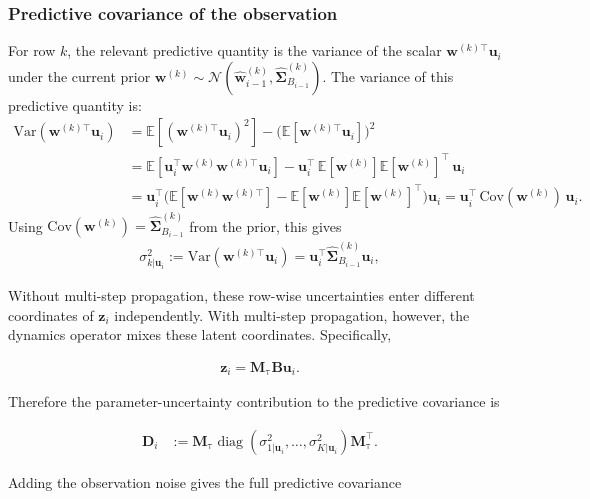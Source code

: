 \documentclass[11pt,letterpaper]{article} %
\begin{document}
\subsubsection*{Predictive covariance of the observation}
For row $k$, the relevant predictive quantity is the variance of the scalar $\bm{w}^{(k)\top}\bm{u}_i$ under the current prior $\bm{w}^{(k)}\sim\mathcal N(\hat{\bm{w}}_{i-1}^{(k)},\hat{\bm{\Sigma}}_{B_{i-1}}^{(k)})$. The variance of this predictive quantity is:
\begin{align*}
    \mathrm{Var}(\bm{w}^{(k)\top}\bm{u}_i)
        &= \mathbb{E}\!\left[(\bm{w}^{(k)\top}\bm{u}_i)^2\right] - \big(\mathbb{E}[\bm{w}^{(k)\top}\bm{u}_i]\big)^2 \\
        &= \mathbb{E}\!\left[\bm{u}_i^\top \bm{w}^{(k)}\bm{w}^{(k)\top} \bm{u}_i\right] - \bm{u}_i^\top\,\mathbb{E}[\bm{w}^{(k)}]\mathbb{E}[\bm{w}^{(k)}]^\top\,\bm{u}_i \\
        &= \bm{u}_i^\top\Big(\mathbb{E}\!\left[\bm{w}^{(k)}\bm{w}^{(k)\top}\right] - \mathbb{E}[\bm{w}^{(k)}]\mathbb{E}[\bm{w}^{(k)}]^\top\Big)\bm{u}_i
         = \bm{u}_i^\top\,\mathrm{Cov}(\bm{w}^{(k)})\,\bm{u}_i.
\end{align*}
Using $\mathrm{Cov}(\bm{w}^{(k)})=\hat{\bm{\Sigma}}_{B_{i-1}}^{(k)}$ from the prior, this gives
\begin{align*}
    \sigma^2_{k|\bm{u}_i} := \mathrm{Var}(\bm{w}^{(k)\top}\bm{u}_i) = \bm{u}_i^\top \hat{\bm{\Sigma}}_{B_{i-1}}^{(k)} \bm{u}_i,
\end{align*}

Without multi-step propagation, these row-wise uncertainties enter different coordinates of $\bm{z}_i$ independently. With multi-step propagation, however, the dynamics operator mixes these latent coordinates. Specifically,

\begin{align*}
    \bm{z}_i
    =
    \bm{M}_{\mathrm{\tau}}
    \bm{B}\bm{u}_i.
\end{align*}

Therefore the parameter-uncertainty contribution to the predictive covariance is

\begin{align*}
    \bm{D}_i
    &:=
    \bm{M}_{\mathrm{\tau}}
    \operatorname{diag}
    \left(
        \sigma^2_{1|\bm{u}_i},
        \dots,
        \sigma^2_{K|\bm{u}_i}
    \right)
    \bm{M}_{\mathrm{\tau}}^\top.
\end{align*}

Adding the observation noise gives the full predictive covariance
\end{document}
